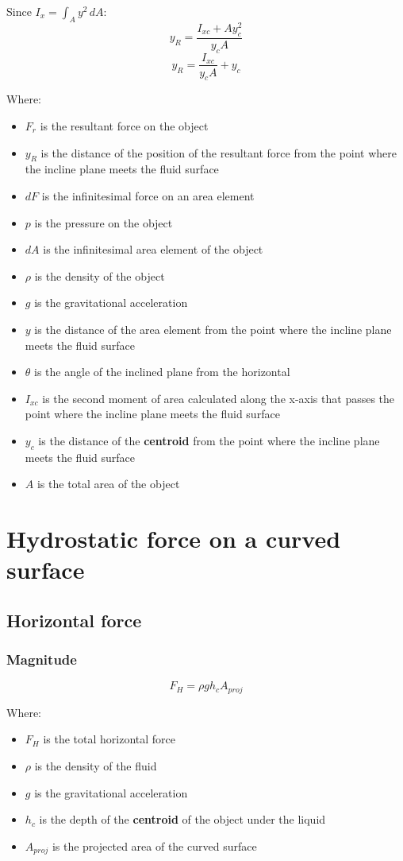 \documentclass[11pt]{article}
\begin{document}
Since \(I_x = \int_A y^2 \, dA\):
\[y_R = \frac{I_{xc} + Ay_c^2}{y_c A}\]
\[y_R = \frac{I_{xc}}{y_c A} + y_c\]

Where:
\begin{itemize}
\item \(F_r\) is the resultant force on the object
\item \(y_R\) is the distance of the position of the resultant force from the point where the incline plane meets the fluid surface
\item \(dF\) is the infinitesimal force on an area element
\item \(p\) is the pressure on the object
\item \(dA\) is the infinitesimal area element of the object
\item \(\rho\) is the density of the object
\item \(g\) is the gravitational acceleration
\item \(y\) is the distance of the area element from the point where the incline plane meets the fluid surface
\item \(\theta\) is the angle of the inclined plane from the horizontal
\item \(I_{xc}\) is the second moment of area calculated along the x-axis that passes the point where the incline plane meets the fluid surface
\item \(y_c\) is the distance of the \textbf{centroid} from the point where the incline plane meets the fluid surface
\item \(A\) is the total area of the object
\end{itemize}
\section{Hydrostatic force on a curved surface}
\label{sec:orge61772a}

\subsection{Horizontal force}
\label{sec:org3de3bc4}

\subsubsection{Magnitude}
\label{sec:org0b141c6}
\[F_H = \rho g h_c A_{proj}\]

Where:
\begin{itemize}
\item \(F_H\) is the total horizontal force
\item \(\rho\) is the density of the fluid
\item \(g\) is the gravitational acceleration
\item \(h_c\) is the depth of the \textbf{centroid} of the object under the liquid
\item \(A_{proj}\) is the projected area of the curved surface
\end{itemize}
\end{document}

